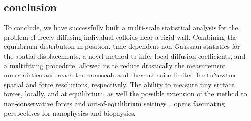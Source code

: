 \subsection{conclusion}
To conclude, we have successfully built a multi-scale statistical analysis for the problem of freely diffusing individual colloids near a rigid wall. Combining the equilibrium distribution in position, time-dependent non-Gaussian statistics for the spatial displacements, a novel method to infer local diffusion coefficients, and a multifitting procedure, allowed us to reduce drastically the measurement uncertainties and reach the nanoscale and thermal-noise-limited femtoNewton spatial and force resolutions, respectively. The ability to measure tiny surface forces, locally, and at equilibrium, as well the possible extension of the method to non-conservative forces and out-of-equilibrium settings~\cite{amarouchene_nonequilibrium_2019, mangeat_role_2019}, opens fascinating perspectives for nanophysics and biophysics.
